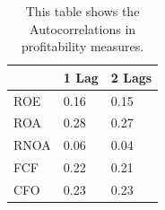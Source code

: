 {{\begin{table}[htb!]
\centering
{}
\caption{This table shows the Pearson correlations for CFO features in our sample.}
\label{tab:CFOCorr}
\end{table}

\begin{table}[htb!]
\centering
\begin{tabular}{|l|l|l|}
\hline
     & 1 Lag & 2 Lags \\ \hline
ROE  & 0.16  & 0.15   \\ \hline
ROA  & 0.28  & 0.27   \\ \hline
RNOA & 0.06  & 0.04   \\ \hline
FCF  & 0.22  & 0.21   \\ \hline
CFO  & 0.23  & 0.23   \\ \hline
\end{tabular}
\caption{This table shows the Autocorrelations in profitability measures.}
\label{tab:AutCorrProfitability}
\end{table}

}}
